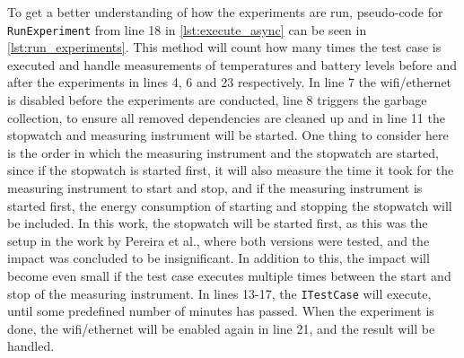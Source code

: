 To get a better understanding of how the experiments are run, pseudo-code for \texttt{RunExperiment} from line 18 in \cref{lst:execute_async} can be seen in \cref{lst:run_experiments}. This method will count how many times the test case is executed and handle measurements of temperatures and battery levels before and after the experiments in lines 4, 6 and 23 respectively. In line 7 the wifi/ethernet is disabled before the experiments are conducted, line 8 triggers the garbage collection, to ensure all removed dependencies are cleaned up and in line 11 the stopwatch and measuring instrument will be started. One thing to consider here is the order in which the measuring instrument and the stopwatch are started, since if the stopwatch is started first, it will also measure the time it took for the measuring instrument to start and stop, and if the measuring instrument is started first, the energy consumption of starting and stopping the stopwatch will be included. In this work, the stopwatch will be started first, as this was the setup in the work by Pereira et al.\cite*[]{Pereira2017}, where both versions were tested, and the impact was concluded to be insignificant. In addition to this, the impact will become even small if the test case executes multiple times between the start and stop of the measuring instrument. In lines 13-17, the \texttt{ITestCase} will execute, until some predefined number of minutes has passed. When the experiment is done, the wifi/ethernet will be enabled again in line 21, and the result will be handled.





